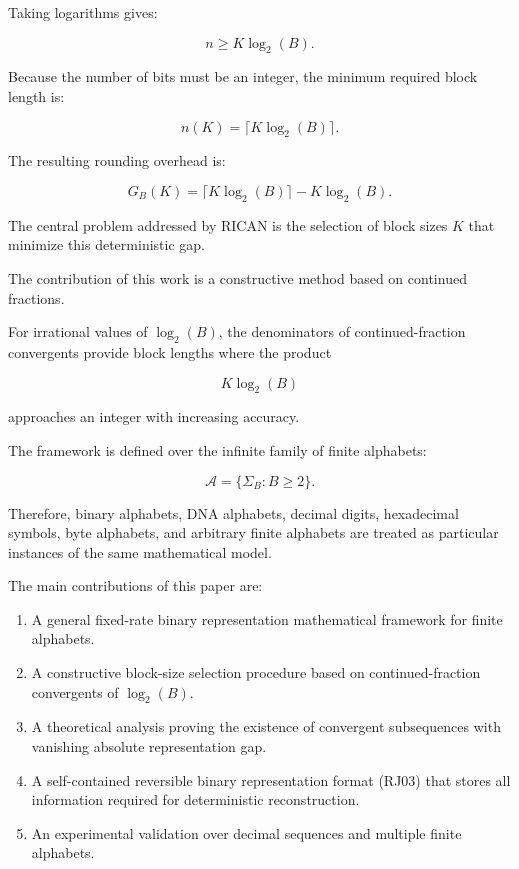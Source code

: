 \documentclass[onecolumn]{IEEEtran}
\begin{document}
Taking logarithms gives:

\[
n\geq K\log_2(B).
\]

Because the number of bits must be an integer, the minimum required
block length is:

\[
n(K)=\lceil K\log_2(B)\rceil .
\]

The resulting rounding overhead is:

\[
G_B(K)=
\lceil K\log_2(B)\rceil
-
K\log_2(B).
\]

The central problem addressed by RICAN is the selection of block sizes
$K$ that minimize this deterministic gap.

The contribution of this work is a constructive method based on
continued fractions.

For irrational values of $\log_2(B)$, the denominators of
continued-fraction convergents provide block lengths where the product

\[
K\log_2(B)
\]

approaches an integer with increasing accuracy.

The framework is defined over the infinite family of finite alphabets:

\[
\mathcal{A}
=
\{\Sigma_B:B\geq2\}.
\]

Therefore, binary alphabets, DNA alphabets, decimal digits,
hexadecimal symbols, byte alphabets, and arbitrary finite alphabets
are treated as particular instances of the same mathematical model.

The main contributions of this paper are:

\begin{enumerate}

\item A general fixed-rate binary representation mathematical framework
for finite alphabets.

\item A constructive block-size selection procedure based on
continued-fraction convergents of $\log_2(B)$.

\item A theoretical analysis proving the existence of convergent
subsequences with vanishing absolute representation gap.

\item A self-contained reversible binary representation format (RJ03)
that stores all information required for deterministic reconstruction.

\item An experimental validation over decimal sequences and multiple
finite alphabets.

\end{enumerate}
\end{document}
